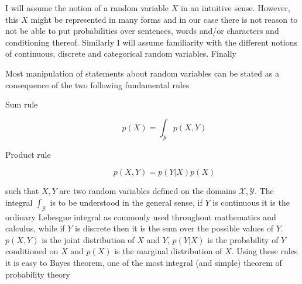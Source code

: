 I will assume the notion of a random variable $X$ in an intuitive sense.
However, this $X$ might be represented in many forms and in our case there is
not reason to not be able to put probabilities over sentences, words and/or
characters and conditioning thereof. Similarly I will assume familiarity with
the different notions of continuous, discrete and categorical random variables.
Finally 

Most manipulation of statements about random variables can be stated as a consequence
of the two following fundamental rules
\begin{description}
\item[Sum rule]
  \begin{equation}
    \label{eq:sum_rule}
    p(X) = \int_{\mathcal{Y}}p(X, Y)
  \end{equation}
\item[Product rule]
  \begin{equation}
    \label{eq:product_rule}
    p(X, Y) = p(Y | X)p(X)
  \end{equation}
\end{description}
such that $X, Y$ are two random variables defined on the domains $\mathcal{X},
\mathcal{Y}$. The integral $\int_{\mathcal{Y}}$ is to be understood in the
general sense, if $Y$ is continuous it is the ordinary Lebesgue integral as
commonly used throughout mathematics and calculus, while if $Y$ is discrete then
it is the sum over the possible values of $Y$. $p(X, Y)$ is the joint
distribution of $X$ and $Y$, $p(Y | X)$ is the probability of $Y$ conditioned on
$X$ and $p(X)$ is the marginal distribution of $X$. Using these rules it is easy
to Bayes theorem, one of the most integral (and simple) theorem of probability
theory



